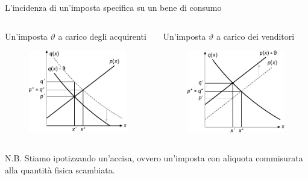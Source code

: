 \documentclass[aspectratio=64,11pt]{beamer}
\begin{document}
\begin{frame}{L'incidenza di un'imposta specifica su un bene di consumo}
\begin{columns}
\begin{column}{.5\columnwidth}
Un'imposta $\vartheta$ a carico degli acquirenti

\begin{figure}[htbp]
\centering
\includegraphics[width=\textwidth]{./figure/incidenza-2.pdf}
\end{figure}
\end{column}

\begin{column}{.5\columnwidth}
Un'imposta $\vartheta$ a carico dei venditori

\begin{figure}[htbp]
\centering
\includegraphics[width=\textwidth]{./figure/incidenza-3.pdf}
\end{figure}
\end{column}
\end{columns}

N.B. Stiamo ipotizzando un'accisa, ovvero un'imposta con aliquota commisurata alla quantità fisica scambiata.
\end{frame}
\end{document}
